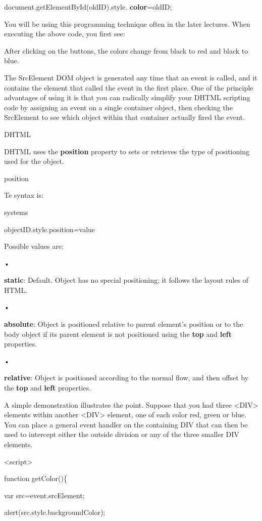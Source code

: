 \documentclass[
]{article}
\begin{document}
document.getElementById(oldID).style. \textbf{color}=oldID;

You will be using this programming technique often in the later
lectures. When executing the above code, you first see:

After clicking on the buttons, the colors change from black to red and
black to blue.

The SrcElement DOM object is generated any time that an event is called,
and it contains the element that called the event in the first place.
One of the principle advantages of using it is that you can radically
simplify your DHTML scripting code by assigning an event on a single
container object, then checking the SrcElement to see which object
within that container actually fired the event.

DHTML

DHTML uses the \textbf{position} property to sets or retrieves the type
of positioning used for the object.

position

Te syntax is:

systems

objectID.style.position=value

Possible values are:

•

\textbf{static}: Default. Object has no special positioning; it follows
the layout rules of HTML.

•

\textbf{absolute}: Object is positioned relative to parent element's
position or to the body object if its parent element is not positioned
using the \textbf{top} and \textbf{left} properties.

•

\textbf{relative}: Object is positioned according to the normal flow,
and then offset by the \textbf{top} and \textbf{left} properties.

A simple demonstration illustrates the point. Suppose that you had three
\textless DIV\textgreater{} elements within another
\textless DIV\textgreater{} element, one of each color red, green or
blue. You can place a general event handler on the containing DIV that
can then be used to intercept either the outside division or any of the
three smaller DIV elements.

\textless script\textgreater{}

function getColor()\{

var src=event.srcElement;

alert(src.style.backgroundColor);
\end{document}
